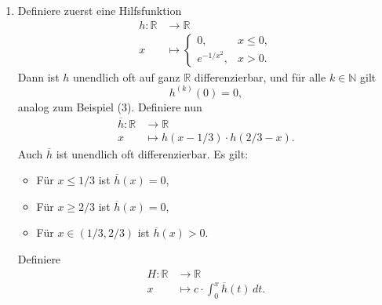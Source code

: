 \documentclass[../main.tex]{subfiles}
\begin{document}
\begin{examples}
\begin{enumerate}[(1)]
    \item Definiere zuerst eine Hilfsfunktion
      \begin{align*}
        h \colon \mathbb{R} & \to \mathbb{R} \\
        x & \mapsto 
        \begin{cases}
          0, & x \leq 0,\\
          e^{-1/x^2}, & x > 0.
        \end{cases}
      \end{align*}
      Dann ist $h$ unendlich oft auf ganz $\mathbb{R}$ 
      differenzierbar, und für alle $k \in \mathbb{N}$ 
      gilt 
      \[
      h^{(k)}(0) = 0,
      \]
      analog zum Beispiel (3).
      Definiere nun
      \begin{align*}
        \overline h \colon \mathbb{R} & \to \mathbb{R} \\
        x & \mapsto h(x - 1/3) \cdot h(2/3 - x).
      \end{align*}
      Auch $\overline h$ ist unendlich oft differenzierbar.
      Es gilt:
      \begin{itemize}
        \item Für $x \leq 1/3$ ist $\overline h(x) = 0$,
        \item Für $x \geq 2/3$ ist $\overline h(x) = 0$,
        \item Für $x \in (1/3, 2/3)$ ist $\overline h(x) > 0$.
      \end{itemize}
      Definiere
      \begin{align*}
        H \colon \mathbb{R} & \to \mathbb{R} \\
        x & \mapsto 
        c \cdot 
        \int_{0}^{x} \overline h(t) \, dt.
      \end{align*}
      

\end{enumerate}
\end{examples}
\end{document}
